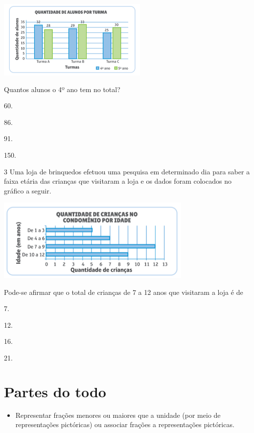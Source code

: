 \begin{mdframed}[linewidth=2pt,linecolor=salmao,roundcorner=2pt]
\begin{escolha}
{\includegraphics[width=2.89744in,height=1.52156in]{media/image104.png}

Quantos alunos o 4º ano tem no total?

\begin{escolha}
\item
  60.
\item
  86.
\item
  91.
\item
  150.
\end{escolha}



\num{3} Uma loja de brinquedos efetuou uma pesquisa em determinado dia para
saber a faixa etária das crianças que visitaram a loja e os dados foram
colocados no gráfico a seguir.

\includegraphics[width=3.77564in,height=1.60972in]{media/image105.png}

Pode-se afirmar que o total de crianças
de 7 a 12 anos que visitaram a loja é de

\begin{escolha}
\item
  7.
\item
  12.
\item
  16.
\item
  21.
\end{escolha}


\chapter{Partes do todo}


\begin{itemize}
\item Representar frações menores ou maiores que a unidade (por meio de
representações pictóricas) ou associar frações a representações pictóricas.


\end{itemize}}
\end{escolha}
\end{mdframed}
